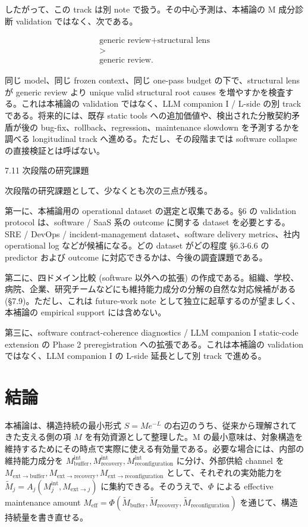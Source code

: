 \documentclass[12pt,a4paper]{article}
\begin{document}
したがって、この track は別 note で扱う。その中心予測は、本補論の M 成分診断 validation ではなく、次である。

\[
\begin{aligned}
\text{generic review} + \text{structural lens} \\
> \\
\text{generic review}.
\end{aligned}
\]

同じ model、同じ frozen context、同じ one-pass budget の下で、structural lens が generic review より unique valid structural root causes を増やすかを検査する。これは本補論の validation ではなく、LLM companion I / L-side の別 track である。将来的には、既存 static tools への追加価値や、検出された分散契約矛盾が後の bug-fix、rollback、regression、maintenance slowdown を予測するかを調べる longitudinal track へ進める。ただし、その段階までは software collapse の直接検証とは呼ばない。

7.11 次段階の研究課題

次段階の研究課題として、少なくとも次の三点が残る。

第一に、本補論用の operational dataset の選定と収集である。§6 の validation protocol は、software / SaaS 系の outcome に関する dataset を必要とする。SRE / DevOps / incident-management dataset、software delivery metrics、社内 operational log などが候補になる。どの dataset がどの程度 §6.3-6.6 の predictor および outcome に対応できるかは、今後の調査課題である。

第二に、四ドメイン比較 (software 以外への拡張) の作成である。組織、学校、病院、企業、研究チームなどにも維持能力成分の分解の自然な対応候補がある (§7.9)。ただし、これは future-work note として独立に起草するのが望ましく、本補論の empirical support には含めない。

第三に、software contract-coherence diagnostics / LLM companion I static-code extension の Phase 2 preregistration への拡張である。これは本補論の validation ではなく、LLM companion I の L-side 延長として別 track で進める。

\section{結論}\label{ux7d50ux8ad6}

本補論は、構造持続の最小形式 \(S = M e^{-L}\) の右辺のうち、従来から理解されてきた支える側の項 \(M\) を有効資源として整理した。M の最小意味は、対象構造を維持するためにその時点で実際に使える有効量である。必要な場合には、内部の維持能力成分を \(M_{\mathrm{buffer}}^{\mathrm{int}}, M_{\mathrm{recovery}}^{\mathrm{int}}, M_{\mathrm{reconfiguration}}^{\mathrm{int}}\) に分け、外部供給 channel を \(M_{\mathrm{ext}\to\mathrm{buffer}}, M_{\mathrm{ext}\to\mathrm{recovery}}, M_{\mathrm{ext}\to\mathrm{reconfiguration}}\) として、それぞれの実効能力を \(\widetilde M_j = A_j(M_j^{\mathrm{int}}, M_{\mathrm{ext}\to j})\) に集約できる。そのうえで、\(\Phi\) による effective maintenance amount \(M_{\mathrm{eff}} = \Phi(\widetilde M_{\mathrm{buffer}}, \widetilde M_{\mathrm{recovery}}, \widetilde M_{\mathrm{reconfiguration}})\) を通じて、構造持続量を書き直せる。
\end{document}
